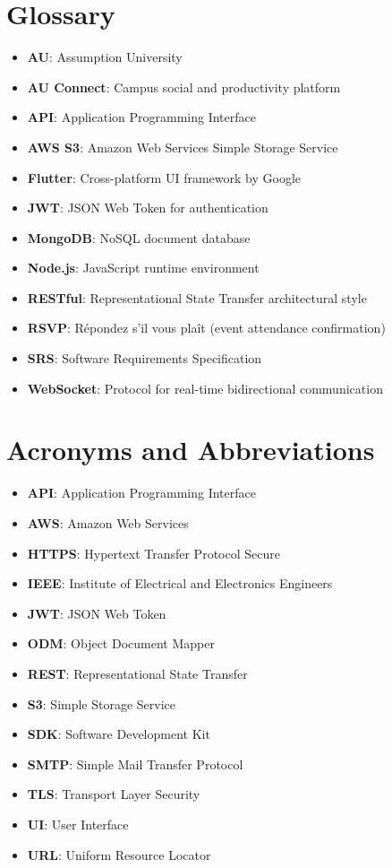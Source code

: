 \documentclass[12pt,a4paper]{article}
\begin{document}
\appendix

\section{Glossary}
\begin{itemize}
    \item \textbf{AU}: Assumption University
    \item \textbf{AU Connect}: Campus social and productivity platform
    \item \textbf{API}: Application Programming Interface
    \item \textbf{AWS S3}: Amazon Web Services Simple Storage Service
    \item \textbf{Flutter}: Cross-platform UI framework by Google
    \item \textbf{JWT}: JSON Web Token for authentication
    \item \textbf{MongoDB}: NoSQL document database
    \item \textbf{Node.js}: JavaScript runtime environment
    \item \textbf{RESTful}: Representational State Transfer architectural style
    \item \textbf{RSVP}: Répondez s'il vous plaît (event attendance confirmation)
    \item \textbf{SRS}: Software Requirements Specification
    \item \textbf{WebSocket}: Protocol for real-time bidirectional communication
\end{itemize}

\section{Acronyms and Abbreviations}
\begin{itemize}
    \item \textbf{API}: Application Programming Interface
    \item \textbf{AWS}: Amazon Web Services
    \item \textbf{HTTPS}: Hypertext Transfer Protocol Secure
    \item \textbf{IEEE}: Institute of Electrical and Electronics Engineers
    \item \textbf{JWT}: JSON Web Token
    \item \textbf{ODM}: Object Document Mapper
    \item \textbf{REST}: Representational State Transfer
    \item \textbf{S3}: Simple Storage Service
    \item \textbf{SDK}: Software Development Kit
    \item \textbf{SMTP}: Simple Mail Transfer Protocol
    \item \textbf{TLS}: Transport Layer Security
    \item \textbf{UI}: User Interface
    \item \textbf{URL}: Uniform Resource Locator
\end{itemize}
\end{document}
